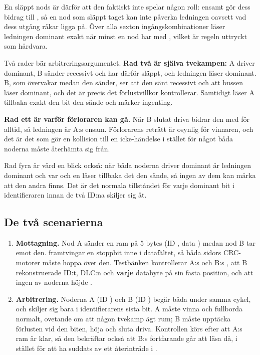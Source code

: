 En släppt nods  är \code{-} därför att den faktiskt inte spelar någon roll:
 ensamt gör dess bidrag till , så en nod som släppt taget kan inte påverka
ledningen oavsett vad dess utgång råkar ligga på. Över alla sexton ingångskombinationer läser
ledningen dominant exakt när minst en nod har  med , vilket är
regeln uttryckt som hårdvara.

Två rader bär arbitreringsargumentet. \textbf{Rad två är själva tvekampen:} A driver dominant, B
sänder recessivt och har därför släppt, och ledningen läser dominant. B, som övervakar medan den
sänder, ser att den sänt recessivt och att bussen läser dominant, och det är precis det förlustvillkor
 kontrollerar. Samtidigt läser A tillbaka exakt den bit den sände och märker
ingenting.

\textbf{Rad ett är varför förloraren kan gå.} När B slutat driva bidrar den med  för alltid,
så ledningen är A:s ensam. Förlorarens reträtt är osynlig för vinnaren, och det är det som gör en
kollision till en icke-händelse i stället för något båda noderna måste återhämta sig från.

Rad fyra är värd en blick också: när båda noderna driver dominant är ledningen dominant och var och
en läser tillbaka det den sände, så ingen av dem kan märka att den andra finns. Det är det normala
tillståndet för varje dominant bit i identifieraren innan de två ID:na skiljer sig åt.

\subsection*{De två scenarierna}
\begin{enumerate}
  \item \textbf{Mottagning.} Nod A sänder en ram på 5 bytes (ID , data
    ) medan nod B tar emot den.  framtvingar en stoppbit inne i
    datafältet, så båda sidors CRC-motorer måste hoppa över den. Testbänken kontrollerar A:s
     och B:s , att B rekonstruerade ID:t, DLC:n och \textbf{varje}
    databyte på sin fasta position, och att ingen av noderna höjde .
  \item \textbf{Arbitrering.} Noderna A (ID ) och B (ID ) begär båda under
    samma cykel, och skiljer sig bara i identifierarens sista bit. A måste vinna och fullborda
    normalt, ovetande om att någon tvekamp ägt rum; B måste upptäcka förlusten vid den biten, höja
     och sluta driva. Kontrollen körs efter att A:s ram är klar, så den bekräftar också
    att B:s  fortfarande går att läsa då, i stället för att ha suddats av ett återinträde
    i .
\end{enumerate}

